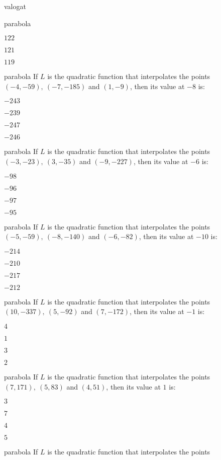 \documentclass[12pt]{article}
\begin{document}
\begin{quiz}{valogat}
\begin{multi}{parabola}
\item  $ 122 $
\item  $ 121 $
\item  $ 119 $
\end{multi}
\begin{multi}{parabola}
If $L$ is the quadratic function that interpolates the points
$(-4,-59),\ (-7,-185)$ and $(1,-9)$, then its value at $-8$ is:
\item* $ -243 $
\item  $ -239 $
\item  $ -247 $
\item  $ -246 $
\end{multi}
\begin{multi}{parabola}
If $L$ is the quadratic function that interpolates the points
$(-3,-23),\ (3,-35)$ and $(-9,-227)$, then its value at $-6$ is:
\item* $ -98 $
\item  $ -96 $
\item  $ -97 $
\item  $ -95 $
\end{multi}
\begin{multi}{parabola}
If $L$ is the quadratic function that interpolates the points
$(-5,-59),\ (-8,-140)$ and $(-6,-82)$, then its value at $-10$ is:
\item* $ -214 $
\item  $ -210 $
\item  $ -217 $
\item  $ -212 $
\end{multi}
\begin{multi}{parabola}
If $L$ is the quadratic function that interpolates the points
$(10,-337),\ (5,-92)$ and $(7,-172)$, then its value at $-1$ is:
\item* $ 4 $
\item  $ 1 $
\item  $ 3 $
\item  $ 2 $
\end{multi}
\begin{multi}{parabola}
If $L$ is the quadratic function that interpolates the points
$(7,171),\ (5,83)$ and $(4,51)$, then its value at $1$ is:
\item* $ 3 $
\item  $ 7 $
\item  $ 4 $
\item  $ 5 $
\end{multi}
\begin{multi}{parabola}
If $L$ is the quadratic function that interpolates the points

\end{multi}
\end{quiz}
\end{document}

